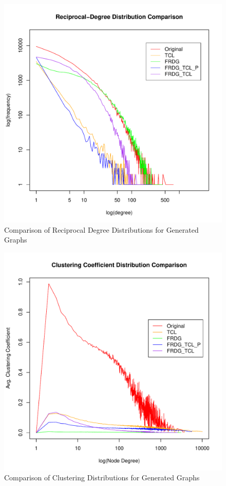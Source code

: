 \documentclass[pdftex,11pt,a4paper,twocolumn]{scrartcl}
\begin{document}
\begin{figure}[h!]
\centering
\includegraphics[width=\columnwidth]{generatedComparison_recipDeg.pdf} 
\caption{Comparison of Reciprocal Degree Distributions for Generated Graphs \label{fig:genRecipDeg}}
\end{figure}

\pagebreak

\begin{figure}[h!]
\centering
\includegraphics[width=\columnwidth]{generatedComparison_clustering.pdf} 
\caption{Comparison of Clustering Distributions for Generated Graphs \label{fig:genCluster}}
\end{figure}
\end{document}
